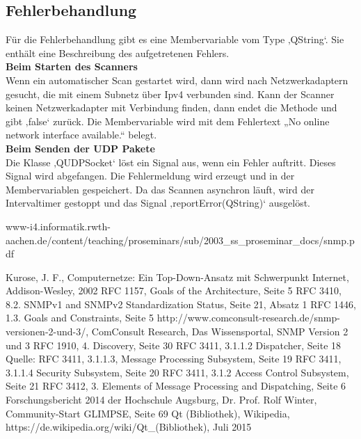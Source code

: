 \documentclass[11pt,a4paper]{article}
\begin{document}
\subsection{Fehlerbehandlung}
Für die Fehlerbehandlung gibt es eine Membervariable vom Type ‚QString‘. Sie enthält eine Beschreibung des aufgetretenen Fehlers.\\
\textbf{Beim Starten des Scanners}\\
Wenn ein automatischer Scan gestartet wird, dann wird nach Netzwerkadaptern gesucht, die mit einem Subnetz über Ipv4 verbunden sind. Kann der 	Scanner keinen Netzwerkadapter mit Verbindung finden, dann endet die Methode und gibt ‚false‘ zurück. Die Membervariable wird mit dem 						Fehlertext „No online network interface available.“ belegt.\\
\textbf{Beim Senden der UDP Pakete}\\
Die Klasse ‚QUDPSocket‘ löst ein Signal aus, wenn ein Fehler auftritt. Dieses Signal wird abgefangen. Die Fehlermeldung wird erzeugt und in der 				Membervariablen gespeichert. Da das Scannen asynchron läuft, wird der Intervaltimer gestoppt und das Signal ‚reportError(QString)‘ ausgelöst.

\newpage
\begin{thebibliography}{10}
	\begin{small}
		www-i4.informatik.rwth-aachen.de/content/teaching/proseminars/sub/2003\_ss\_proseminar\_docs/snmp.pdf
	\end{small}
		Kurose, J. F.,
		Computernetze: Ein Top-Down-Ansatz mit Schwerpunkt Internet,
		Addison-Wesley,
		2002
		RFC 1157, Goals of the Architecture, Seite 5
		RFC 3410, 8.2.  SNMPv1 and SNMPv2 Standardization Status, Seite 21, Absatz 1
		RFC 1446, 1.3.  Goals and Constraints, Seite 5
		http://www.comconsult-research.de/snmp-versionen-2-und-3/,
		ComConsult Research, Das Wissensportal, SNMP Version 2 und 3
		RFC 1910, 4. Discovery, Seite 30
		RFC 3411,  3.1.1.2 Dispatcher, Seite 18
		Quelle: RFC 3411, 3.1.1.3, Message Processing Subsystem, Seite 19
		RFC 3411, 3.1.1.4 Security Subsystem, Seite 20
		RFC 3411, 3.1.2  Access Control Subsystem, Seite 21
		RFC 3412, 3. Elements of Message Processing and Dispatching, Seite 6
		Forschungsbericht 2014 der Hochschule Augsburg,
		Dr. Prof. Rolf Winter,
		Community-Start GLIMPSE,
		Seite 69
		Qt (Bibliothek), Wikipedia, https://de.wikipedia.org/wiki/Qt\_(Bibliothek), Juli 2015
\end{thebibliography}
\end{document}
